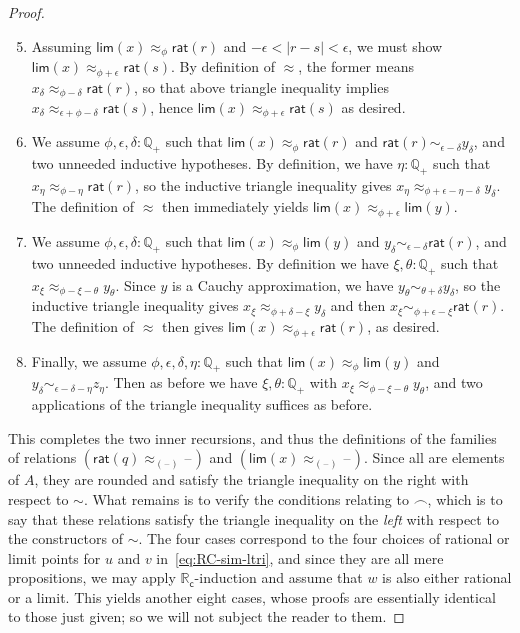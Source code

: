 \documentclass[10pt,a4paper]{article}
\newcommand{\blank}{\mathord{\hspace{1pt}\text{--}\hspace{1pt}}}
\newcommand{\Q}{\ensuremath{\mathbb{Q}}\xspace}
\newcommand{\RC}{\ensuremath{\mathbb{R}_\mathsf{c}}\xspace} %
\newcommand{\close}[1]{\sim_{#1}} %
\newcommand{\closesym}{\mathord\sim}
\newcommand{\rclim}{\mathsf{lim}} %
\newcommand{\rcrat}{\mathsf{rat}} %
\newcommand{\Qp}{\Q_{+}}
\newcommand{\bsim}{\frown}
\theoremstyle{definition}
\theoremstyle{remark}
\numberwithin{equation}{section}
\begin{document}
\begin{proof}
  \begin{enumerate}\setcounter{enumi}{4}
  \item Assuming $\rclim(x)\approx_\phi \rcrat(r)$ and $-\epsilon<|r-s|<\epsilon$, we must show $\rclim(x)\approx_{\phi+\epsilon} \rcrat(s)$.
    By definition of $\approx$, the former means $x_\delta \approx_{\phi-\delta} \rcrat(r)$, so that above triangle inequality implies $x_\delta \approx_{\epsilon+\phi-\delta} \rcrat(s)$, hence $\rclim(x)\approx_{\phi+\epsilon} \rcrat(s)$ as desired.
  \item We assume $\phi,\epsilon,\delta:\Qp$ such that $\rclim(x)\approx_\phi \rcrat(r)$ and $\rcrat(r) \close{\epsilon-\delta} y_\delta$, and two unneeded inductive hypotheses.
    By definition, we have $\eta:\Qp$ such that $x_\eta \approx_{\phi-\eta} \rcrat(r)$, so the inductive triangle inequality gives $x_\eta \approx_{\phi+\epsilon-\eta-\delta} y_\delta$.
    The definition of $\approx$ then immediately yields $\rclim(x) \approx_{\phi+\epsilon} \rclim(y)$.
  \item We assume $\phi,\epsilon,\delta:\Qp$ such that $\rclim(x)\approx_\phi \rclim(y)$ and $y_\delta \close{\epsilon-\delta} \rcrat(r)$, and two unneeded inductive hypotheses.
    By definition we have $\xi,\theta:\Qp$ such that $x_\xi \approx_{\phi-\xi-\theta} y_\theta$.
    Since $y$ is a Cauchy approximation, we have $y_\theta \close{\theta+\delta} y_\delta$, so the inductive triangle inequality gives $x_\xi \approx_{\phi+\delta-\xi} y_\delta$ and then $x_\xi \close{\phi+\epsilon-\xi} \rcrat(r)$.
    The definition of $\approx$ then gives $\rclim(x) \approx_{\phi+\epsilon}\rcrat(r)$, as desired.
  \item Finally, we assume $\phi,\epsilon,\delta,\eta:\Qp$ such that $\rclim(x)\approx_\phi \rclim(y)$ and $y_\delta \close{\epsilon-\delta-\eta} z_\eta$.
    Then as before we have $\xi,\theta:\Qp$ with $x_\xi \approx_{\phi-\xi-\theta} y_\theta$, and two applications of the triangle inequality suffices as before.
  \end{enumerate}

  This completes the two inner recursions, and thus the definitions of the families of relations $(\rcrat(q)\approx_{(\blank)}\blank)$ and $(\rclim(x)\approx_{(\blank)}\blank)$.
  Since all are elements of $A$, they are rounded and satisfy the triangle inequality on the right with respect to $\closesym$.
  What remains is to verify the conditions relating to $\bsim$, which is to say that these relations satisfy the triangle inequality on the \emph{left} with respect to the constructors of $\closesym$.
  The four cases correspond to the four choices of rational or limit points for $u$ and $v$ in~\eqref{eq:RC-sim-ltri}, and since they are all mere propositions, we may apply $\RC$-induction and assume that $w$ is also either rational or a limit.
  This yields another eight cases, whose proofs are essentially identical to those just given; so we will not subject the reader to them.
\end{proof}



\end{document}
